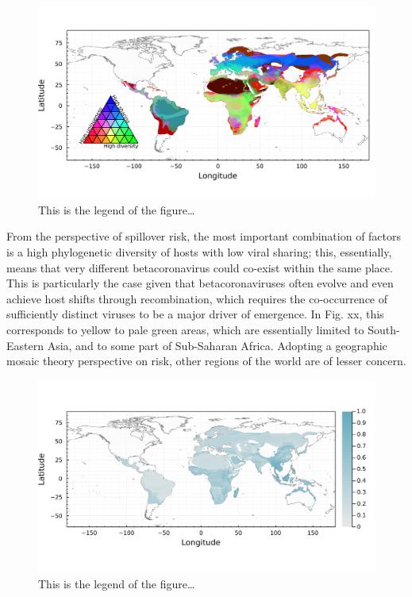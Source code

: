 \documentclass[10pt,oneside]{article}
\makeatletter
\def\maxwidth{\ifdim\Gin@nat@width>\linewidth\linewidth
\else\Gin@nat@width\fi}
\let\Oldincludegraphics\includegraphics
\renewcommand{\includegraphics}[1]{\Oldincludegraphics[width=\maxwidth]{#1}}
\makeatother
\begin{document}
\begin{figure}
\hypertarget{fig:trivariate}{%
\centering
\includegraphics{figures/risk_trivariate.png}
\caption{This is the legend of the figure\ldots{}}\label{fig:trivariate}
}
\end{figure}

From the perspective of spillover risk, the most important combination
of factors is a high phylogenetic diversity of hosts with low viral
sharing; this, essentially, means that very different betacoronavirus
could co-exist within the same place. This is particularly the case
given that betacoronaviruses often evolve and even achieve host shifts
through recombination, which requires the co-occurrence of sufficiently
distinct viruses to be a major driver of emergence. In Fig. xx, this
corresponds to yellow to pale green areas, which are essentially limited
to South-Eastern Asia, and to some part of Sub-Saharan Africa. Adopting
a geographic mosaic theory perspective on risk, other regions of the
world are of lesser concern.

\begin{figure}
\hypertarget{fig:risk}{%
\centering
\includegraphics{figures/risk_map.png}
\caption{This is the legend of the figure\ldots{}}\label{fig:risk}
}
\end{figure}
\end{document}
